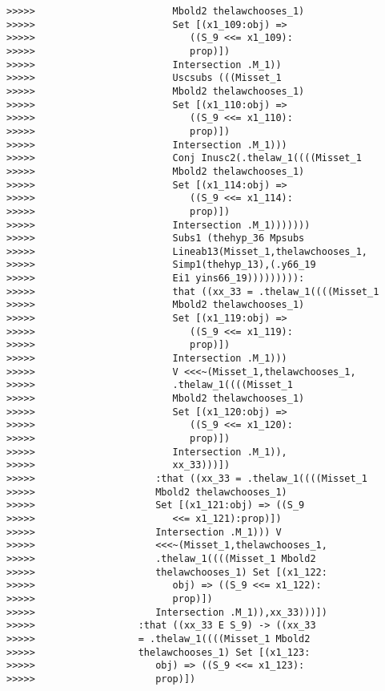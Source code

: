 \documentclass[12pt]{article}
\begin{document}
\begin{verbatim}
>>>>>                        Mbold2 thelawchooses_1)
>>>>>                        Set [(x1_109:obj) =>
>>>>>                           ((S_9 <<= x1_109):
>>>>>                           prop)])
>>>>>                        Intersection .M_1))
>>>>>                        Uscsubs (((Misset_1
>>>>>                        Mbold2 thelawchooses_1)
>>>>>                        Set [(x1_110:obj) =>
>>>>>                           ((S_9 <<= x1_110):
>>>>>                           prop)])
>>>>>                        Intersection .M_1)))
>>>>>                        Conj Inusc2(.thelaw_1((((Misset_1
>>>>>                        Mbold2 thelawchooses_1)
>>>>>                        Set [(x1_114:obj) =>
>>>>>                           ((S_9 <<= x1_114):
>>>>>                           prop)])
>>>>>                        Intersection .M_1)))))))
>>>>>                        Subs1 (thehyp_36 Mpsubs
>>>>>                        Lineab13(Misset_1,thelawchooses_1,
>>>>>                        Simp1(thehyp_13),(.y66_19
>>>>>                        Ei1 yins66_19))))))))):
>>>>>                        that ((xx_33 = .thelaw_1((((Misset_1
>>>>>                        Mbold2 thelawchooses_1)
>>>>>                        Set [(x1_119:obj) =>
>>>>>                           ((S_9 <<= x1_119):
>>>>>                           prop)])
>>>>>                        Intersection .M_1)))
>>>>>                        V <<<~(Misset_1,thelawchooses_1,
>>>>>                        .thelaw_1((((Misset_1
>>>>>                        Mbold2 thelawchooses_1)
>>>>>                        Set [(x1_120:obj) =>
>>>>>                           ((S_9 <<= x1_120):
>>>>>                           prop)])
>>>>>                        Intersection .M_1)),
>>>>>                        xx_33)))])
>>>>>                     :that ((xx_33 = .thelaw_1((((Misset_1
>>>>>                     Mbold2 thelawchooses_1)
>>>>>                     Set [(x1_121:obj) => ((S_9
>>>>>                        <<= x1_121):prop)])
>>>>>                     Intersection .M_1))) V
>>>>>                     <<<~(Misset_1,thelawchooses_1,
>>>>>                     .thelaw_1((((Misset_1 Mbold2
>>>>>                     thelawchooses_1) Set [(x1_122:
>>>>>                        obj) => ((S_9 <<= x1_122):
>>>>>                        prop)])
>>>>>                     Intersection .M_1)),xx_33)))])
>>>>>                  :that ((xx_33 E S_9) -> ((xx_33
>>>>>                  = .thelaw_1((((Misset_1 Mbold2
>>>>>                  thelawchooses_1) Set [(x1_123:
>>>>>                     obj) => ((S_9 <<= x1_123):
>>>>>                     prop)])

\end{verbatim}
\end{document}
